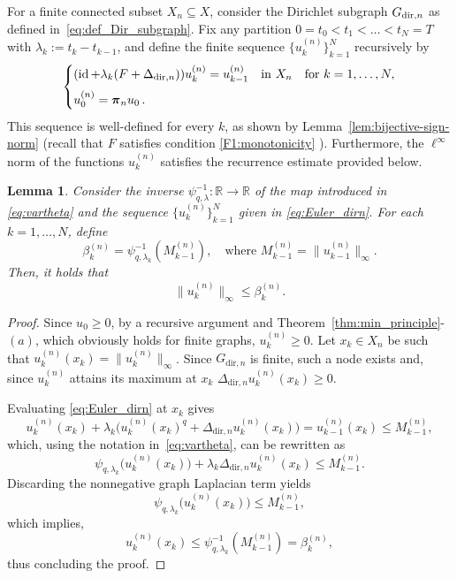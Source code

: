 \documentclass[journal]{article}
\theoremstyle{nonitalic}
\theoremstyle{nonitalic}
\theoremstyle{plain} %
\newtheorem{lemma}[theorem]{Lemma}
\numberwithin{equation}{section}
\newcommand{\R}{\mathbb{R}}
\begin{document}
For a finite connected subset $X_n \subseteq X$, consider the Dirichlet subgraph $G_{\textnormal{dir},n}$ as defined in~\eqref{eq:def_Dir_subgraph}. Fix  any partition $0=t_0<t_1<\ldots<t_N= T$ with $\lambda_k:=t_k-t_{k-1}$, and define the finite sequence $\{u_k^{(n)}\}_{k=1}^N$ recursively by
\begin{equation}\label{eq:Euler_dirn}
\begin{cases}
   (\operatorname{id} + \lambda_k (F + \Delta_{\textnormal{dir}, n}))u_k^{(n)}  = u_{k-1}^{(n)} \quad \text{in }X_n & \text{for } k = 1,\dots,N,\\[6pt]
   u^{(n)}_0 = \boldsymbol{\pi}_n u_0\,.
\end{cases}
\end{equation}
This sequence is well-defined for every $k$, as shown by Lemma~\ref{lem:bijective-sign-norm} (recall that $F$ satisfies condition \textnormal{\ref{F1:monotonicity}} ). Furthermore, the $\ell^{\infty}$ norm of the functions $u_k^{(n)}$ satisfies the recurrence estimate provided below. 

\begin{lemma}\label{lem:upper_bound_k}
Consider the inverse $\psi_{q,\lambda}^{-1}: \R \to\R$ of the map introduced in \eqref{eq:vartheta} and the sequence $\{u_k^{(n)}\}_{k=1}^N$ given in \eqref{eq:Euler_dirn}. For each $k = 1,\dots,N$, define
\begin{equation}
\beta_k^{(n)} = \psi_{q,\lambda_k}^{-1}(M_{k-1}^{(n)}), \quad \text{where } M_{k-1}^{(n)} = \|u_{k-1}^{(n)}\|_\infty.
\end{equation}
Then, it holds that
\[
\|u_{k}^{(n)}\|_\infty \leq \beta_k^{(n)}.
\]
\end{lemma}
\begin{proof}
Since $u_0 \geq 0$, by a recursive argument and Theorem~\ref{thm:min_principle}-$(a)$, which obviously holds for finite graphs, $u_k^{(n)}\geq 0$. Let $x_k\in X_n$ be such that $u_k^{(n)}(x_k)=\|u_k^{(n)}\|_\infty$.  
Since $G_{\mathrm{dir},n}$ is finite, such a node exists and, since $u_k^{(n)}$ attains its maximum at $x_k$ 
$\Delta_{\mathrm{dir},n}u_k^{(n)}(x_k)\ge0$. 

Evaluating \eqref{eq:Euler_dirn} at $x_k$ gives
$$
u_k^{(n)}(x_k)+\lambda_k
\big(u_k^{(n)}(x_k)^{q}+\Delta_{\mathrm{dir},n}u_k^{(n)}(x_k)\big)
=u_{k-1}^{(n)}(x_k)\leq M_{k-1}^{(n)},
$$
which, using the notation in~\eqref{eq:vartheta}, can be rewritten as 
$$
\psi_{q,\lambda_k}\big(u_k^{(n)}(x_k)\big) + \lambda_k\Delta_{\mathrm{dir},n}u_k^{(n)}(x_k)\leq M_{k-1}^{(n)}.
$$
Discarding the nonnegative graph Laplacian term yields
\[
\psi_{q,\lambda_k}\big(u_k^{(n)}(x_k)\big)\le M_{k-1}^{(n)},
\]
which implies,
$$
u_k^{(n)}(x_k)\le \psi_{q,\lambda_k}^{-1}(M_{k-1}^{(n)}) = \beta_k^{(n)},
$$
thus concluding the proof.
\end{proof}
\end{document}
